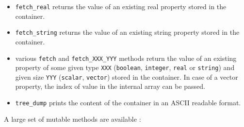 \begin{itemize}
\item  \texttt{fetch\_real}  returns the  value  of  an existing  real
  property stored in the container.
  
\item \texttt{fetch\_string}  returns the value of  an existing string
  property stored in the container.
  
\item  various  \texttt{fetch}  and  \texttt{fetch\_XXX\_YYY}  methods
  return  the  value  of  an  existing property  of  some  given  type
  \texttt{XXX}  (\texttt{boolean}, \texttt{integer},  \texttt{real} or
  \texttt{string})  and   given  size  \texttt{YYY}  (\texttt{scalar},
  \texttt{vector})  stored in  the  container.  In  case  of a  vector
  property, the index of value in the internal array can be passed.
  
\item \texttt{tree\_dump}  prints the content  of the container  in an
  ASCII readable format.

\end{itemize}

\pn A large set of mutable methods are available :

